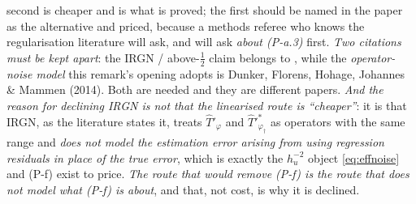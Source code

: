 \begin{remark}
\begin{enumerate}
second is cheaper and is what is proved; the first should be named in the paper as the alternative and
priced, because a methods referee who knows the regularisation literature will ask, and will ask
\emph{about \textup{(P-a.3)}} first.
\emph{Two citations must be kept apart}: the IRGN / above-$\tfrac12$ claim
belongs to \citet{dunker2021}, while the \emph{operator-noise model} this remark's opening adopts is
Dunker, Florens, Hohage, Johannes \& Mammen (2014). Both are needed and they are different papers.
\emph{And the reason for declining IRGN is not that the linearised route is ``cheaper''}: it is
that IRGN, as the literature states it, treats $\hat T'_\varphi$ and $\hat T'^{\ast}_{\varphi_\dagger}$
as operators with the same range and \emph{does not model the estimation error arising from using
regression residuals in place of the true error}, which is exactly the $h_u^{-2}$ object
\eqref{eq:effnoise} and (P-f) exist to price. \emph{The route that would remove (P-f) is the route that
does not model what (P-f) is about}, and that, not cost, is why it is declined.
\end{enumerate}
\end{remark}

